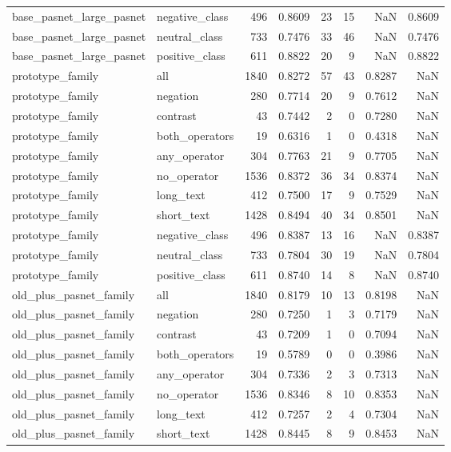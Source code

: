 \begin{tabular}{llrrrrrr}
base\_pasnet\_large\_pasnet & negative\_class & 496 & 0.8609 & 23 & 15 & NaN & 0.8609 \\
base\_pasnet\_large\_pasnet & neutral\_class & 733 & 0.7476 & 33 & 46 & NaN & 0.7476 \\
base\_pasnet\_large\_pasnet & positive\_class & 611 & 0.8822 & 20 & 9 & NaN & 0.8822 \\
prototype\_family & all & 1840 & 0.8272 & 57 & 43 & 0.8287 & NaN \\
prototype\_family & negation & 280 & 0.7714 & 20 & 9 & 0.7612 & NaN \\
prototype\_family & contrast & 43 & 0.7442 & 2 & 0 & 0.7280 & NaN \\
prototype\_family & both\_operators & 19 & 0.6316 & 1 & 0 & 0.4318 & NaN \\
prototype\_family & any\_operator & 304 & 0.7763 & 21 & 9 & 0.7705 & NaN \\
prototype\_family & no\_operator & 1536 & 0.8372 & 36 & 34 & 0.8374 & NaN \\
prototype\_family & long\_text & 412 & 0.7500 & 17 & 9 & 0.7529 & NaN \\
prototype\_family & short\_text & 1428 & 0.8494 & 40 & 34 & 0.8501 & NaN \\
prototype\_family & negative\_class & 496 & 0.8387 & 13 & 16 & NaN & 0.8387 \\
prototype\_family & neutral\_class & 733 & 0.7804 & 30 & 19 & NaN & 0.7804 \\
prototype\_family & positive\_class & 611 & 0.8740 & 14 & 8 & NaN & 0.8740 \\
old\_plus\_pasnet\_family & all & 1840 & 0.8179 & 10 & 13 & 0.8198 & NaN \\
old\_plus\_pasnet\_family & negation & 280 & 0.7250 & 1 & 3 & 0.7179 & NaN \\
old\_plus\_pasnet\_family & contrast & 43 & 0.7209 & 1 & 0 & 0.7094 & NaN \\
old\_plus\_pasnet\_family & both\_operators & 19 & 0.5789 & 0 & 0 & 0.3986 & NaN \\
old\_plus\_pasnet\_family & any\_operator & 304 & 0.7336 & 2 & 3 & 0.7313 & NaN \\
old\_plus\_pasnet\_family & no\_operator & 1536 & 0.8346 & 8 & 10 & 0.8353 & NaN \\
old\_plus\_pasnet\_family & long\_text & 412 & 0.7257 & 2 & 4 & 0.7304 & NaN \\
old\_plus\_pasnet\_family & short\_text & 1428 & 0.8445 & 8 & 9 & 0.8453 & NaN \\

\end{tabular}
